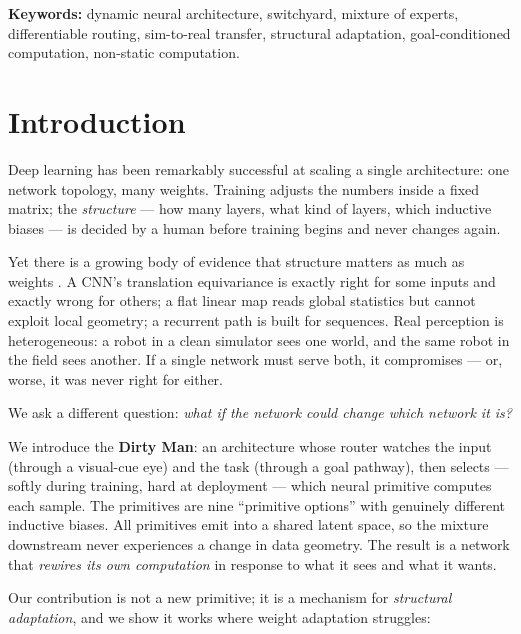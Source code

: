 \documentclass[11pt,a4paper]{article}
\begin{document}
\noindent\textbf{Keywords:} dynamic neural architecture, switchyard, mixture of experts, differentiable routing, sim-to-real transfer, structural adaptation, goal-conditioned computation, non-static computation.

\section{Introduction}
\label{sec:intro}

Deep learning has been remarkably successful at scaling a single architecture: one network topology, many weights. Training adjusts the numbers inside a fixed matrix; the \emph{structure} --- how many layers, what kind of layers, which inductive biases --- is decided by a human before training begins and never changes again.

Yet there is a growing body of evidence that structure matters as much as weights \cite{repvgg,condcomp,switchtransformer}. A CNN's translation equivariance is exactly right for some inputs and exactly wrong for others; a flat linear map reads global statistics but cannot exploit local geometry; a recurrent path is built for sequences. Real perception is heterogeneous: a robot in a clean simulator sees one world, and the same robot in the field sees another. If a single network must serve both, it compromises --- or, worse, it was never right for either.

We ask a different question: \emph{what if the network could change which network it is?}

We introduce the \textbf{Dirty Man}: an architecture whose router watches the input (through a visual-cue eye) and the task (through a goal pathway), then selects --- softly during training, hard at deployment --- which neural primitive computes each sample. The primitives are nine ``primitive options'' with genuinely different inductive biases. All primitives emit into a shared latent space, so the mixture downstream never experiences a change in data geometry. The result is a network that \emph{rewires its own computation} in response to what it sees and what it wants.

Our contribution is not a new primitive; it is a mechanism for \emph{structural adaptation}, and we show it works where weight adaptation struggles:
\end{document}
